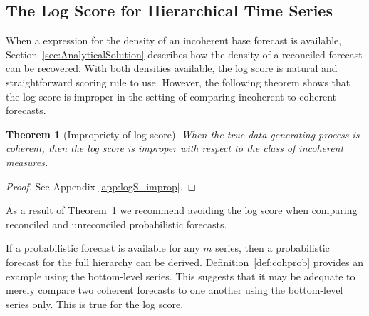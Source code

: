 \documentclass[12pt]{article}
\newtheorem{theo}{Theorem}[section]
\theoremstyle{definition}
\begin{document}


\subsection{The Log Score for Hierarchical Time Series}

When a expression for the density of an incoherent base forecast is available, Section~\ref{sec:AnalyticalSolution} describes how the density of a reconciled forecast can be recovered.  With both densities available, the log score is natural and straightforward scoring rule to use.  However, the following theorem shows that the log score is improper in the setting of comparing incoherent to coherent forecasts.

\begin{theo}[Impropriety of log score]\label{theo:logS_improp}
	When the true data generating process is coherent, then the log score is improper with respect to the class of incoherent measures.
\end{theo}

\begin{proof}
	See Appendix \ref{app:logS_improp}.
\end{proof}

As a result of Theorem~\ref{theo:logS_improp} we recommend avoiding the log score when comparing reconciled and unreconciled probabilistic forecasts.

If a probabilistic forecast is available for any $m$ series, then a probabilistic forecast for the full hierarchy can be derived.  Definition~\ref{def:cohprob} provides an example using the bottom-level series. This suggests that it may be adequate to merely compare two coherent forecasts to one another using the bottom-level series only. This is true for the log score.
\end{document}

